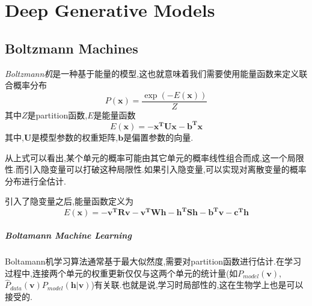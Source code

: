 \chapter{Deep Generative Models}

\section{Boltzmann Machines}

\textit{Boltzmann机}是一种基于能量的模型,这也就意味着我们需要使用能量函数来定义联合概率分布
\begin{equation}
P(\mathbf x)=\frac{\exp(-E(\mathbf x))}{Z}
\end{equation}
其中$Z$是partition函数,$E$是能量函数
\begin{equation}
E(\mathbf x)=\mathbf{-x^TUx-b^Tx}
\end{equation}
其中,$\mathbf U$是模型参数的权重矩阵,$\mathbf b$是偏置参数的向量.

从上式可以看出,某个单元的概率可能由其它单元的概率线性组合而成,这一个局限性.而引入隐变量可以打破这种局限性.如果引入隐变量,可以实现对离散变量的概率分布进行全估计.

引入了隐变量之后,能量函数定义为
\begin{equation}
E(\mathbf x)=\mathbf{-v^TRv-v^TWh-h^TSh-b^Tv-c^Th}
\end{equation}

\paragraph{Boltamann Machine Learning} Boltamann机学习算法通常基于最大似然度,需要对partition函数进行估计.在学习过程中,连接两个单元的权重更新仅仅与这两个单元的统计量(如$P_{model}(\mathbf v)$,$\hat P_{data}(\mathbf v)P_{model}(\mathbf{h|v})$)有关联.也就是说,学习时局部性的,这在生物学上也是可以接受的.